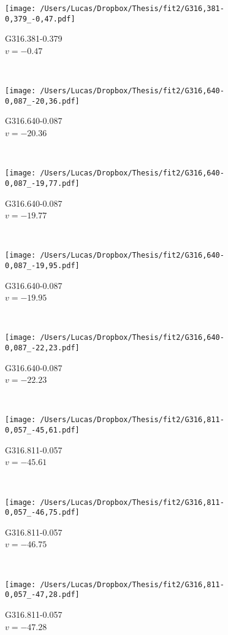 \begin{figure*}[t]\ContinuedFloat
	\centering
	\begin{subfigure}[t]{0.3\textwidth}
		\texttt{[image: /Users/Lucas/Dropbox/Thesis/fit2/G316,381-0,379\_-0,47.pdf]}
		\caption[]{G316.381-0.379\\$v=-0.47$\,\kms}
	\end{subfigure}
	~
	\begin{subfigure}[t]{0.3\textwidth}
		\texttt{[image: /Users/Lucas/Dropbox/Thesis/fit2/G316,640-0,087\_-20,36.pdf]}
		\caption[]{G316.640-0.087\\$v=-20.36$\,\kms}
	\end{subfigure}
	~
	\begin{subfigure}[t]{0.3\textwidth}
		\texttt{[image: /Users/Lucas/Dropbox/Thesis/fit2/G316,640-0,087\_-19,77.pdf]}
		\caption[]{G316.640-0.087\\$v=-19.77$\,\kms}
	\end{subfigure}
	~
	\begin{subfigure}[t]{0.3\textwidth}
		\texttt{[image: /Users/Lucas/Dropbox/Thesis/fit2/G316,640-0,087\_-19,95.pdf]}
		\caption[]{G316.640-0.087\\$v=-19.95$\,\kms}
	\end{subfigure}
	~
	\begin{subfigure}[t]{0.3\textwidth}
		\texttt{[image: /Users/Lucas/Dropbox/Thesis/fit2/G316,640-0,087\_-22,23.pdf]}
		\caption[]{G316.640-0.087\\$v=-22.23$\,\kms}
	\end{subfigure}
	~
	\begin{subfigure}[t]{0.3\textwidth}
		\texttt{[image: /Users/Lucas/Dropbox/Thesis/fit2/G316,811-0,057\_-45,61.pdf]}
		\caption[]{G316.811-0.057\\$v=-45.61$\,\kms}
	\end{subfigure}
	~
	\begin{subfigure}[t]{0.3\textwidth}
		\texttt{[image: /Users/Lucas/Dropbox/Thesis/fit2/G316,811-0,057\_-46,75.pdf]}
		\caption[]{G316.811-0.057\\$v=-46.75$\,\kms}
	\end{subfigure}
	~
	\begin{subfigure}[t]{0.3\textwidth}
		\texttt{[image: /Users/Lucas/Dropbox/Thesis/fit2/G316,811-0,057\_-47,28.pdf]}
		\caption[]{G316.811-0.057\\$v=-47.28$\,\kms}

\end{subfigure}
\end{figure*}
